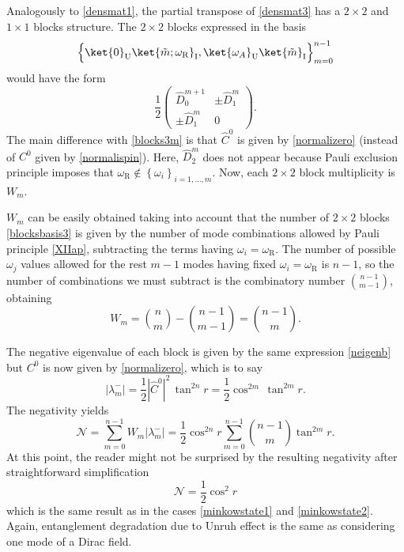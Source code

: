 Analogously to \eqref{densmat1}, the partial transpose of \eqref{densmat3} has a $2\times2$ and $1\times1$ blocks structure. The 
$2\times2$ blocks expressed in the basis
\begin{equation}\label{blocksbasis3}
\Big\{\ket{0}_\text{U}\ket{\tilde m;\omega_\text{R}}_\text{I},\ket{\omega_A}_\text{U}\ket{\tilde m}_\text{I}\Big\}_{m=0}^{n-1}
\end{equation}
would have the form 
\begin{equation}\label{blockszero}
\frac12
\left(\begin{array}{cc}
\hat D^{m+1}_0 & \pm \hat D_1^m\\
\pm \hat D_1^m & 0
\end{array}\right).
\end{equation}
The main difference with \eqref{blocks3m} is that $\hat C^0$ is given by \eqref{normalizero} (instead of $C^0$ given by \eqref{normalispin}). Here, $\hat D_2^m$ does not appear because Pauli exclusion principle imposes that $\omega_\text{R}\not\in\left\{\omega_i\right\}_{i=1,\dots,m}$. Now, each $2\times2$ block multiplicity is $W_m$.

$W_m$ can be easily obtained taking into account that the number of $2\times2$ blocks \eqref{blocksbasis3} is given by the number of mode combinations allowed by Pauli principle \eqref{XIIap}, subtracting the terms having $\omega_i=\omega_\text{R}$. The number of possible $\omega_j$ values allowed for the rest $m-1$ modes having fixed $\omega_i=\omega_\text{R}$ is $n-1$, so the number of combinations we must subtract is the combinatory number $\binom{n-1}{m-1}$, obtaining
 \begin{equation}\label{Nblocks3ap}W_m=\binom{n}{m}-\binom{n-1}{m-1}=\binom{n-1}{m}.\end{equation}

The negative eigenvalue of each block is given by the same expression \eqref{neigenb} but $C^0$ is now given by 
\eqref{normalizero}, which is to say
\begin{equation}\label{neigenb0}
|\lambda^-_m|=\frac12|\hat C^0|^2\,\tan^{2n} r=\frac12\cos^{2m}\,\tan^{2m} r.
\end{equation}
 The negativity yields
\begin{equation}\label{negazeropre}
\mathcal{N}=\sum_{m=0}^{n-1} W_m|\lambda^-_m|=\frac12\cos^{2n} r\sum_{m=0}^{n-1}\binom{n-1}{m}\tan^{2m}r.
\end{equation}
At this point, the reader might not be surprised by the resulting negativity after straightforward simplification
\begin{equation}\label{negazero}
\mathcal{N}=\frac{1}{2}\cos^2 r
\end{equation}
which is the same result as in the cases \eqref{minkowstate1} and 
\eqref{minkowstate2}. Again, entanglement degradation due to Unruh effect is 
the same as considering one mode of a Dirac field.

